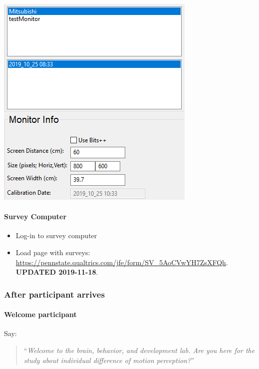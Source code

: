 \documentclass[]{article}
\providecommand{\tightlist}{%
  \setlength{\itemsep}{0pt}\setlength{\parskip}{0pt}}
\let\oldparagraph\paragraph
\renewcommand{\paragraph}[1]{\oldparagraph{#1}\mbox{}}
\begin{document}
\begin{itemize}
  \includegraphics{images/pp3.PNG}
\end{itemize}

\paragraph{Survey Computer}\label{survey-computer}

\begin{itemize}
\tightlist
\item
  Log-in to survey computer
\item
  Load page with surveys:
  \url{https://pennstate.qualtrics.com/jfe/form/SV_5AoCVwYH7ZsXFQh}.
  \textbf{UPDATED 2019-11-18}.
\end{itemize}

\subsubsection{After participant
arrives}\label{after-participant-arrives}

\paragraph{Welcome participant}\label{welcome-participant}

Say:

\begin{quote}
``\emph{Welcome to the brain, behavior, and development lab. Are you
here for the study about individual difference of motion perception?}''
\end{quote}
\end{document}
